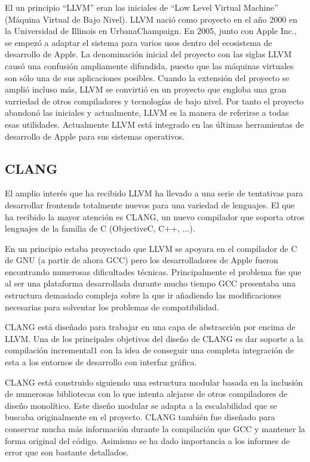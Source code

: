 El un principio ``LLVM'' eran las iniciales de ``Low Level Virtual Machine'' (M\'aquina Virtual de Bajo Nivel). LLVM naci\'o como proyecto en el a\~no 2000 en la Universidad de Illinois en UrbanaChampaign. En 2005, junto con Apple Inc., se empez\'o a adaptar el sistema para varios usos dentro del ecosistema de desarrollo de Apple. La denominaci\'on inicial del proyecto con las siglas LLVM caus\'o una confusi\'on ampliamente difundida, puesto que las m\'aquinas virtuales son s\'olo una de sus aplicaciones posibles. Cuando la extensi\'on del proyecto se ampli\'o incluso m\'as, LLVM se convirti\'o en un proyecto que engloba una gran varriedad de otros compiladores y tecnolog\'ias de bajo nivel. Por tanto el proyecto abandon\'o las iniciales y actualmente, LLVM es la manera de referirse a todas esas utilidades. Actualmente LLVM est\'a integrado en las \'ultimas herramientas de desarrollo de Apple para sus sistemas operativos.

\subsection{CLANG}

El amplio inter\'es que ha recibido LLVM ha llevado a una serie de tentativas para desarrollar frontends totalmente nuevos para una variedad de lenguajes. El que ha recibido la mayor atenci\'on es CLANG, un nuevo compilador que soporta otros lenguajes de la familia de C (ObjectiveC, C++, \etc ...).

En un principio estaba proyectado que LLVM se apoyara en el compilador de C de GNU (a partir de ahora GCC) pero los desarrolladores de Apple fueron encontrando numerosas dificultades t\'ecnicas. Principalmente el problema fue que al ser una plataforma desarrollada durante mucho tiempo GCC presentaba una estructura demasiado compleja sobre la que ir a\~nadiendo las modificaciones necesarias para solventar los problemas de compatibilidad.

CLANG est\'a dise\~nado para trabajar en una capa de abstracci\'on por encima de LLVM. Una de los principales objetivos del dise\~no de CLANG es dar soporte a la compilaci\'on incremental1 con la idea de conseguir una completa integraci\'on de esta a los entornos de desarrollo con interfaz gr\'afica.

CLANG est\'a construido siguiendo una estructura modular basada en la inclusi\'on de numerosas bibliotecas con lo que intenta alejarse de otros compiladores de dise\~no monol\'itico. Este dise\~no modular se adapta a la escalabilidad que se buscaba originalmente en el proyecto. CLANG tambi\'en fue dise\~nado para conservar mucha m\'as informaci\'on durante la compilaci\'on que GCC y mantener la forma original del c\'odigo. Asimismo se ha dado importancia a los informes de error que son bastante detallados.


